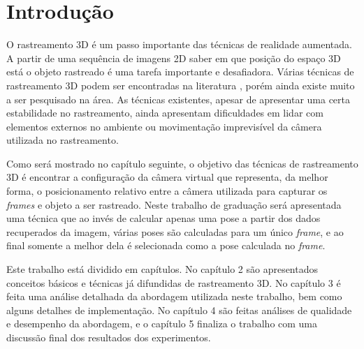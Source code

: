 \chapter{Introdução}

O rastreamento 3D é um passo importante das técnicas de realidade aumentada. A partir de uma sequência de imagens 2D saber em que posição do espaço 3D está o objeto rastreado é uma tarefa importante e desafiadora. Várias técnicas de rastreamento 3D podem ser encontradas na literatura \cite{lepetit}, porém ainda existe muito a ser pesquisado na área. As técnicas existentes, apesar de apresentar uma certa estabilidade no rastreamento, ainda apresentam dificuldades em lidar com elementos externos no ambiente ou movimentação imprevisível da câmera utilizada no rastreamento.

Como será mostrado no capítulo seguinte, o objetivo das técnicas de rastreamento 3D é encontrar a configuração da câmera virtual que representa, da melhor forma, o posicionamento relativo entre a câmera utilizada para capturar os \emph{frames} e objeto a ser rastreado. Neste trabalho de graduação será apresentada uma técnica que ao invés de calcular apenas uma pose a partir dos dados recuperados da imagem, várias poses são calculadas para um único \emph{frame}, e ao final somente a melhor dela é selecionada como a pose calculada no \emph{frame}.

Este trabalho está dividido em capítulos. No capítulo 2 são apresentados conceitos básicos e técnicas já difundidas de rastreamento 3D. No capítulo 3 é feita uma análise detalhada da abordagem utilizada neste trabalho, bem como alguns detalhes de implementação. No capítulo 4 são feitas análises de qualidade e desempenho da abordagem, e o capítulo 5 finaliza o trabalho com uma discussão final dos resultados dos experimentos.